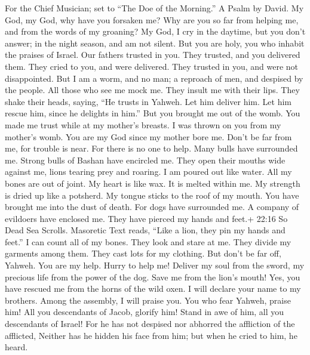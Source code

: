 For the Chief Musician; set to ``The Doe of the Morning.'' A Psalm by
David.  My God, my God, why have you forsaken me? Why are
you so far from helping me, and from the words of my groaning?
 My God, I cry in the daytime, but you don't answer; in the
night season, and am not silent.  But you are holy, you who
inhabit the praises of Israel.  Our fathers trusted in you.
They trusted, and you delivered them.  They cried to you,
and were delivered. They trusted in you, and were not disappointed.
 But I am a worm, and no man; a reproach of men, and
despised by the people.  All those who see me mock me. They
insult me with their lips. They shake their heads, saying, 
``He trusts in Yahweh. Let him deliver him. Let him rescue him, since he
delights in him.''  But you brought me out of the womb. You
made me trust while at my mother's breasts.  I was thrown
on you from my mother's womb. You are my God since my mother bore me.
 Don't be far from me, for trouble is near. For there is no
one to help.  Many bulls have surrounded me. Strong bulls
of Bashan have encircled me.  They open their mouths wide
against me, lions tearing prey and roaring.  I am poured
out like water. All my bones are out of joint. My heart is like wax. It
is melted within me.  My strength is dried up like a
potsherd. My tongue sticks to the roof of my mouth. You have brought me
into the dust of death.  For dogs have surrounded me. A
company of evildoers have enclosed me. They have pierced my hands and
feet.+ 22:16 So Dead Sea Scrolls. Masoretic Text reads, ``Like a lion,
they pin my hands and feet.''  I can count all of my bones.
They look and stare at me.  They divide my garments among
them. They cast lots for my clothing.  But don't be far
off, Yahweh. You are my help. Hurry to help me!  Deliver my
soul from the sword, my precious life from the power of the dog.
 Save me from the lion's mouth! Yes, you have rescued me
from the horns of the wild oxen.  I will declare your name
to my brothers. Among the assembly, I will praise you.  You
who fear Yahweh, praise him! All you descendants of Jacob, glorify him!
Stand in awe of him, all you descendants of Israel!  For he
has not despised nor abhorred the affliction of the afflicted, Neither
has he hidden his face from him; but when he cried to him, he heard.
